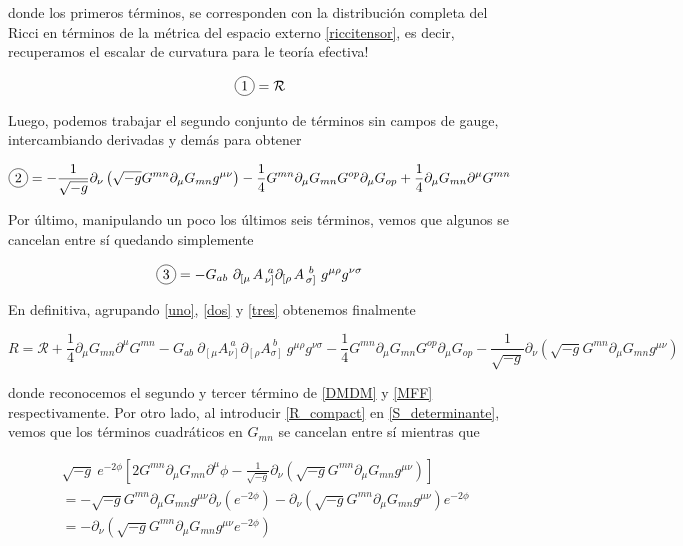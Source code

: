 \documentclass{article}
\numberwithin{equation}{section}
\newcommand*\circled[1]{\tikz[baseline=(char.base)]{ \node[shape=circle,draw,inner sep=2pt] (char) {#1};}} %
\begin{document}
donde los primeros términos, se corresponden con la distribución completa del Ricci en términos de la métrica del espacio externo \ref{riccitensor}, es decir, recuperamos el escalar de curvatura para le teoría efectiva!

\begin{equation}\label{uno}
\circled{1} = \mathcal{R}
\end{equation}

Luego, podemos trabajar el segundo conjunto de términos sin campos de gauge, intercambiando derivadas y demás para obtener

\begin{equation}\label{dos}
\circled{2} = - \frac{1}{\sqrt{-g}} \partial_{\nu} \left( \sqrt{-g} G^{m n} \partial_{\mu}{G_{m n}} g^{\mu \nu} \right) - \frac{1}{4} G^{m n} \partial_{\mu}{G_{m n}} G^{o p} \partial_{\mu}{G_{o p}} + \frac{1}{4} \partial_{\mu}{G_{m n}}\partial^{\mu} G^{m n}
\end{equation}

Por último, manipulando un poco los últimos seis términos, vemos que algunos se cancelan entre sí quedando simplemente

\begin{equation}\label{tres}
\circled{3} = - G_{a b} \ \partial_{\left[\mu\right.} A_{\left.\nu\right]}^{\ a} \partial_{\left[\rho\right.} A_{\left.\sigma\right]}^{\ b} \ g^{\mu \rho} g^{\nu \sigma}
\end{equation}

En definitiva, agrupando \ref{uno}, \ref{dos} y \ref{tres} obtenemos finalmente

\begin{equation}\label{R_compact}
R = \mathcal{R} + \frac{1}{4} \partial_{\mu}{G_{m n}}\partial^{\mu} G^{m n} - G_{a b} \ \partial_{\left[\mu\right.} A_{\left.\nu\right]}^{\ a} \partial_{\left[\rho\right.} A_{\left.\sigma\right]}^{\ b} \ g^{\mu \rho} g^{\nu \sigma} - \frac{1}{4} G^{m n} \partial_{\mu}{G_{m n}} G^{o p} \partial_{\mu}{G_{o p}} - \frac{1}{\sqrt{-g}} \partial_{\nu} \left( \sqrt{-g} G^{m n} \partial_{\mu}{G_{m n}} g^{\mu \nu} \right)
\end{equation}

donde reconocemos el segundo y tercer término de \ref{DMDM} y \ref{MFF} respectivamente. Por otro lado, al introducir \ref{R_compact} en \ref{S_determinante}, vemos que los términos cuadráticos en $ G_{m n} $ se cancelan entre sí mientras que 

\begin{equation}\label{borde}
\begin{aligned}
&\sqrt{-g} \ e^{-2\phi} \left[ 2 G^{m n} \partial_{\mu}G_{m n} \partial^{\mu} \phi  - \frac{1}{\sqrt{-g}} \partial_{\nu} \left( \sqrt{-g} G^{m n} \partial_{\mu}{G_{m n}} g^{\mu \nu} \right) \right]\\
&= - \sqrt{-g} G^{m n} \partial_{\mu}G_{m n} g^{\mu \nu} \partial_{\nu} \left(e^{-2 \phi} \right) - \partial_{\nu} \left( \sqrt{-g} G^{m n} \partial_{\mu}{G_{m n}} g^{\mu \nu} \right) e^{-2 \phi}\\
&= - \partial_{\nu} \left( \sqrt{-g} G^{m n} \partial_{\mu}G_{m n} g^{\mu \nu}e^{-2 \phi}\right)
\end{aligned}
\end{equation}
\end{document}
